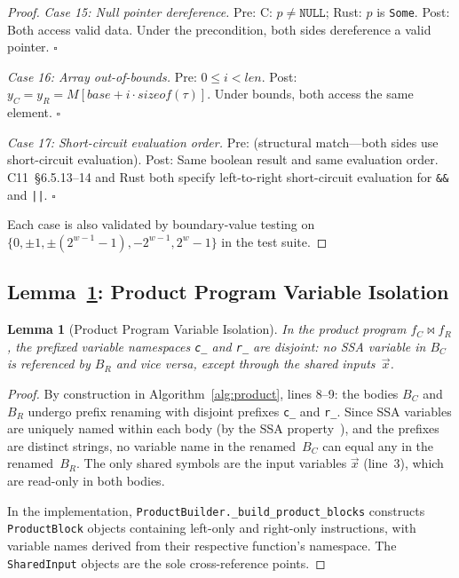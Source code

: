 \documentclass[10pt,a4paper]{article}
\newtheorem{lemma}[theorem]{Lemma}
\begin{document}
\begin{appendices}
\begin{proof}
\emph{Case 15: Null pointer dereference.}
Pre: C: $p \neq \texttt{NULL}$; Rust: $p$ is \texttt{Some}.
Post: Both access valid data.
Under the precondition, both sides dereference a valid pointer.
$\square$

\emph{Case 16: Array out-of-bounds.}
Pre: $0 \leq i < \mathit{len}$.
Post: $y_C = y_R = M[\mathit{base} + i \cdot \mathit{sizeof}(\tau)]$.
Under bounds, both access the same element.  $\square$

\emph{Case 17: Short-circuit evaluation order.}
Pre: (structural match---both sides use short-circuit evaluation).
Post: Same boolean result and same evaluation order.
C11~\S6.5.13--14 and Rust both specify left-to-right short-circuit
evaluation for \texttt{\&\&} and \texttt{||}.  $\square$

Each case is also validated by boundary-value testing on
$\{0, \pm 1, \pm(2^{w-1}-1), -2^{w-1}, 2^w - 1\}$ in the
test suite.
\end{proof}

\subsection{Lemma~\ref{lem:var-isolation}: Product Program Variable
Isolation}

\begin{lemma}[Product Program Variable Isolation]\label{lem:var-isolation}
In the product program $f_C \bowtie f_R$, the prefixed variable
namespaces \texttt{c\_} and \texttt{r\_} are disjoint: no SSA
variable in $B_C$ is referenced by $B_R$ and vice versa, except
through the shared inputs~$\vec{x}$.
\end{lemma}

\begin{proof}
By construction in Algorithm~\ref{alg:product}, lines 8--9: the
bodies $B_C$ and $B_R$ undergo prefix renaming with disjoint prefixes
\texttt{c\_} and \texttt{r\_}.  Since SSA variables are uniquely named
within each body (by the SSA property~\cite{cytron1991ssa}), and the
prefixes are distinct strings, no variable name in the renamed~$B_C$
can equal any in the renamed~$B_R$.  The only shared symbols are the
input variables $\vec{x}$ (line~3), which are read-only in both
bodies.

In the implementation, \texttt{ProductBuilder.\_build\_product\_blocks}
constructs \texttt{ProductBlock} objects containing left-only and
right-only instructions, with variable names derived from their
respective function's namespace.  The \texttt{SharedInput} objects
are the sole cross-reference points.
\end{proof}


\end{appendices}
\end{document}
